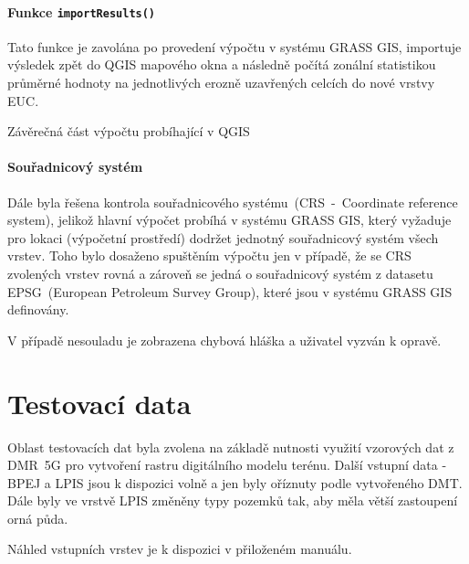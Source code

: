 \paragraph{Funkce \texttt{importResults()}} Tato funkce je zavolána po
provedení výpočtu v systému GRASS GIS, importuje výsledek zpět do QGIS mapového
okna a následně počítá zonální statistikou průměrné hodnoty na
jednotlivých erozně uzavřených celcích do nové vrstvy EUC.
\begin{algorithm}
\caption{Závěrečná část výpočtu probíhající v QGIS}
\label{alg:onAddKFactor}
    \begin{algorithmic}[1] 
   
    \end{algorithmic}
\end{algorithm}

\paragraph{Souřadnicový systém} Dále byla řešena kontrola
souřadnicového systému~(CRS~-~Coordinate reference system), jelikož
hlavní výpočet probíhá v systému GRASS GIS, který vyžaduje pro lokaci
(výpočetní prostředí) dodržet jednotný souřadnicový systém všech
vrstev. Toho bylo dosaženo spuštěním výpočtu jen v případě, že se CRS
zvolených vrstev rovná a zároveň se jedná o souřadnicový systém z datasetu
EPSG~(European Petroleum Survey Group), které jsou v systému GRASS GIS
definovány.

V případě nesouladu je zobrazena chybová hláška a uživatel vyzván k
opravě.

\section{Testovací data} Oblast testovacích dat byla zvolena na
základě nutnosti využití vzorových dat z DMR~5G pro vytvoření rastru
digitálního modelu terénu. Další vstupní data - BPEJ a LPIS jsou k
dispozici volně a jen byly oříznuty podle vytvořeného DMT. Dále byly
ve vrstvě LPIS změněny typy pozemků tak, aby měla větší zastoupení
orná půda.

Náhled vstupních vrstev je k dispozici v přiloženém manuálu.
